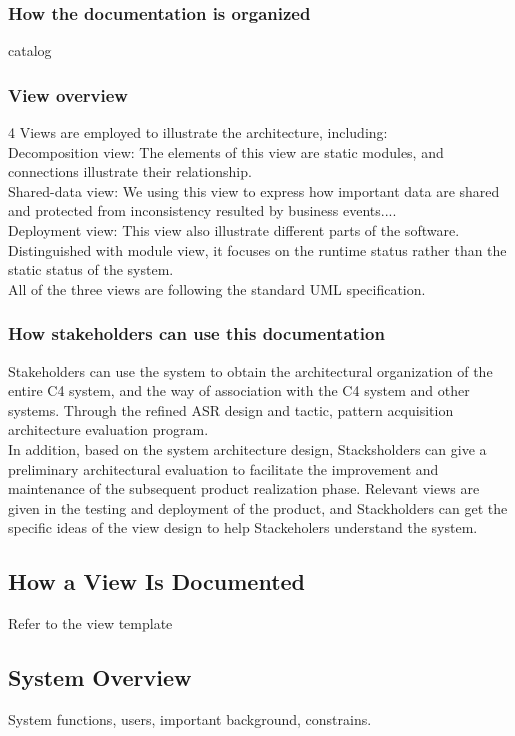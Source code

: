 \documentclass{article}
\begin{document}
	\subsubsection{How the documentation is organized}
	catalog
	\subsubsection{View overview}
	4 Views are employed to illustrate the architecture, including:\\  
	Decomposition view: The elements of this view are static modules, and connections illustrate their relationship.\\  
	Shared-data view: We using this view to express how important data are shared and protected from inconsistency resulted by business events....  \\
	Deployment view: This view also illustrate different parts of the software. Distinguished with module view, it focuses on the runtime status rather than the static status of the system.\\
	All of the three views are following the standard UML specification.
	\subsubsection{How stakeholders can use this documentation}
	Stakeholders can use the system to obtain the architectural organization of the entire C4 system, and the way of association with the C4 system and other systems.
	Through the refined ASR design and tactic, pattern acquisition architecture evaluation program.\\
	In addition, based on the system architecture design, Stacksholders can give a preliminary architectural evaluation to facilitate the improvement and maintenance of the subsequent product realization phase.
	Relevant views are given in the testing and deployment of the product, and Stackholders can get the specific ideas of the view design to help Stackeholers understand the system.\\
	\subsection{How a View Is Documented}
	Refer to the view template

	\subsection{System Overview}
	System functions, users, important background, constrains.
	
\end{document}
